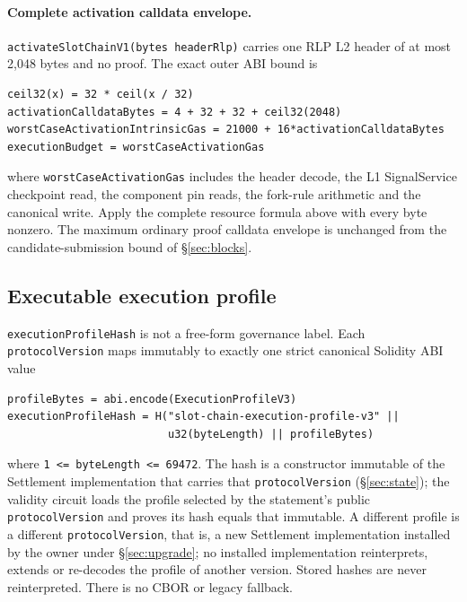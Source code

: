 \documentclass[a4paper,11pt]{article}
\newcommand{\code}[1]{\nolinkurl{#1}}
\begin{document}
\paragraph{Complete activation calldata envelope.}
\code{activateSlotChainV1(bytes headerRlp)} carries one RLP L2 header of at
most 2,048 bytes and no proof.  The exact outer ABI bound is
\begin{verbatim}
ceil32(x) = 32 * ceil(x / 32)
activationCalldataBytes = 4 + 32 + 32 + ceil32(2048)
worstCaseActivationIntrinsicGas = 21000 + 16*activationCalldataBytes
executionBudget = worstCaseActivationGas
\end{verbatim}
where \code{worstCaseActivationGas} includes the header decode, the L1
SignalService checkpoint read, the component pin reads, the fork-rule
arithmetic and the canonical write.  Apply the complete resource formula above
with every byte nonzero.  The maximum ordinary proof calldata envelope is
unchanged from the candidate-submission bound of \S\ref{sec:blocks}.
\subsection{Executable execution profile}\label{sec:profile}

\code{executionProfileHash} is not a free-form governance label.  Each
\code{protocolVersion} maps immutably to exactly one strict canonical Solidity
ABI value
\begin{verbatim}
profileBytes = abi.encode(ExecutionProfileV3)
executionProfileHash = H("slot-chain-execution-profile-v3" ||
                         u32(byteLength) || profileBytes)
\end{verbatim}
where \code{1 <= byteLength <= 69472}.  The hash is a constructor immutable of
the Settlement implementation that carries that \code{protocolVersion}
(\S\ref{sec:state}); the validity circuit loads the profile selected by the
statement's public \code{protocolVersion} and proves its hash equals that
immutable.  A different profile is a different \code{protocolVersion}, that
is, a new Settlement implementation installed by the owner under
\S\ref{sec:upgrade}; no installed implementation reinterprets, extends or
re-decodes the profile of another version.  Stored hashes are never
reinterpreted.  There is no CBOR or legacy fallback.
\end{document}
